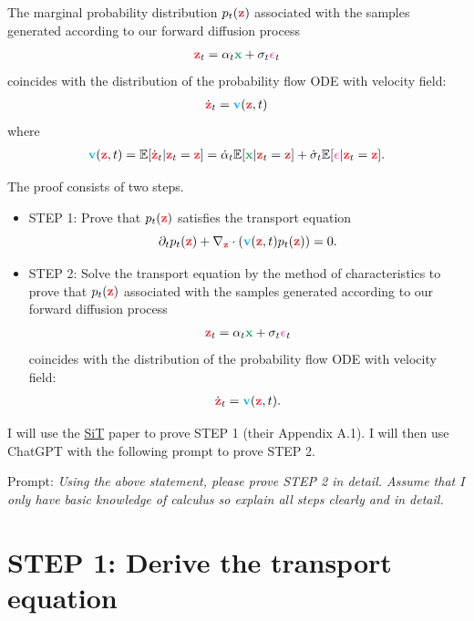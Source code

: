 \documentclass[usenames,dvipsnames]{article}
\newcommand{\myvec}[1]{\mathbf{#1}}
\newcommand{\myvecsym}[1]{\boldsymbol{#1}}
\newcommand{\vx}{\myvec{\textcolor{ForestGreen}{x}}}
\newcommand{\vz}{\myvec{\textcolor{Red}{z}}}
\newcommand{\vv}{\myvec{\textcolor{Cyan}{v}}}
\newcommand{\vepsilon}{\myvecsym{\textcolor{CarnationPink}{\epsilon}}}
\begin{document}
The marginal probability distribution $p_t(\vz)$ associated with the samples generated according to our forward diffusion process
\begin{align}
\vz_t = \alpha_t \vx + \sigma_t \vepsilon_t \nonumber
\end{align}
coincides with the distribution of the probability flow ODE with velocity field:
\begin{align}
\dot{\vz}_t =  \vv(\vz, t)
\end{align}
where
\begin{align}
\vv(\vz, t) = \mathbb{E}[\dot{\vz}_t | \vz_t = \vz] = \dot{\alpha}_t \mathbb{E}[\vx | \vz_t = \vz] + \dot{\sigma}_t \mathbb{E}[\vepsilon | \vz_t = \vz].
\end{align}



The proof consists of two steps.
\begin{itemize}
\item STEP 1: Prove that $p_t(\vz)$ satisfies the transport equation
\begin{equation}
    \partial_t p_t(\vz) + \nabla_{\vz} \cdot (\vv(\vz, t) p_t(\vz)) = 0.
\end{equation}
\item STEP 2: Solve the transport equation by the method of characteristics to prove that $p_t(\vz)$ associated with the samples generated according to our forward diffusion process
\begin{align}
\vz_t = \alpha_t \vx + \sigma_t \vepsilon_t \nonumber
\end{align}
coincides with the distribution of the probability flow ODE with velocity field:
\begin{align}
\dot{\vz}_t =  \vv(\vz, t).
\end{align}
\end{itemize}

I will use the \href{https://arxiv.org/abs/2401.08740}{SiT} paper to prove STEP 1 (their Appendix A.1). I will then use ChatGPT with the following prompt to prove STEP 2.

Prompt:
\emph{Using the above statement, please prove STEP 2 in detail. Assume that I only have basic knowledge of calculus so explain all steps clearly and in detail.}







\section*{STEP 1: Derive the transport equation}
\end{document}
